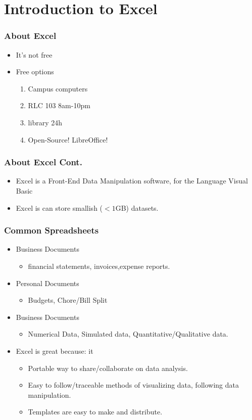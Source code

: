 \documentclass[17pt]{beamer}
\begin{document}
	\section{Introduction to Excel}
	\begin{frame}
		\frametitle{About Excel}
		\begin{itemize}
			\item It's not free
			\item Free options
			\begin{enumerate}
				\item Campus computers
				\item RLC 103 8am-10pm
				\item library 24h 
				\item Open-Source! LibreOffice! 
			\end{enumerate}
		\end{itemize}
	\end{frame}
	\begin{frame}
		\frametitle{About Excel Cont.}
		\begin{itemize}
			\item Excel is a Front-End Data Manipulation software, for the Language Visual Basic
			\item Excel is can store smallish ($<1$GB) datasets.
		\end{itemize}	
	\end{frame}
	\begin{frame}
		\frametitle{Common Spreadsheets}
		\begin{itemize}
			\item Business Documents
			\begin{itemize}
				\item financial statements, invoices,expense reports.		
			\end{itemize}
			\item Personal Documents
			\begin{itemize}
				\item Budgets, Chore/Bill Split		
			\end{itemize}
			\item Business Documents
			\begin{itemize}
				\item Numerical Data, Simulated data, Quantitative/Qualitative data.   
			\end{itemize}
			\item Excel is great because: it 
			\begin{itemize}
				\item Portable way to share/collaborate on data analysis.
				\item Easy to follow/traceable methods of visualizing data, following data manipulation.
				\item Templates are easy to make and distribute. 
			\end{itemize}
		\end{itemize}
	\end{frame}
\end{document}
